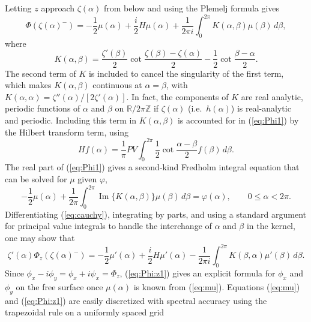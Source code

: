 \documentclass[11pt]{article}
\theoremstyle{plain}
\theoremstyle{definition}
\theoremstyle{definition}
\newcommand{\opn}{\operatorname}
\newcommand{\im}{\opn{Im}}
\newcommand{\mbb}[1]{\mathbb{#1}}
\begin{document}
%
Letting $z$ approach $\zeta(\alpha)$ from below and using the Plemelj
formula \cite{muskhelishvili:sing} gives
%
\begin{equation}
  \label{eq:Phi1}
  \Phi(\zeta(\alpha)^-) = -\frac12\mu(\alpha)+\frac i2H\mu(\alpha) + \frac1{2\pi i}\int_0^{2\pi}
  K(\alpha,\beta)\mu(\beta)\,d\beta,
\end{equation}
%
where
%
\begin{equation}
  \label{eq:K:ab}
  K(\alpha,\beta) =
  \frac{\zeta'(\beta)}2\cot\frac{\zeta(\beta)-\zeta(\alpha)}2 -
  \frac12\cot\frac{\beta-\alpha}2.
\end{equation}
%
The second term of $K$ is included to cancel the singularity of the
first term, which makes $K(\alpha,\beta)$ continuous at
$\alpha=\beta$, with $K(\alpha,\alpha) =
\zeta''(\alpha)/[2\zeta'(\alpha)]$. In fact, the components of $K$ are
real analytic, periodic functions of $\alpha$ and $\beta$ on $\mbb
R/2\pi\mbb Z$ if $\zeta(\alpha)$ (i.e.~$h(\alpha)$) is real-analytic
and periodic.  Including this term in $K(\alpha,\beta)$ is accounted
for in (\ref{eq:Phi1}) by the Hilbert transform term, using
%
\begin{equation}
  H f(\alpha)=\frac1\pi PV\!\int_0^{2\pi}\frac12\cot\frac{\alpha-\beta}2f(\beta)\,d\beta.
\end{equation}
%
The real part of (\ref{eq:Phi1}) gives a second-kind Fredholm integral equation
\cite{folland:pde} that can be solved for $\mu$ given $\varphi$,
%
\begin{equation}\label{eq:mu}
  -\frac12\mu(\alpha) + \frac1{2\pi}\int_0^{2\pi}\im\{K(\alpha,\beta)\}\mu(\beta)\,d\beta
  = \varphi(\alpha), \qquad 0\le\alpha<2\pi.
\end{equation}
%
Differentiating (\ref{eq:cauchy}), integrating by parts, and using a
standard argument for principal value integrals to handle the
interchange of $\alpha$ and $\beta$ in the kernel, one may show
\cite{wilkening-yu:shooting-2012} that
%
\begin{equation}
  \label{eq:Phi:z1}
  \zeta'(\alpha)\Phi_z(\zeta(\alpha)^-) = 
  -\frac12\mu'(\alpha)+\frac i2H\mu'(\alpha) - \frac1{2\pi i}\int_0^{2\pi}
  K(\beta,\alpha)\mu'(\beta)\,d\beta.
\end{equation}
%
Since $\phi_x-i\phi_y = \phi_x+i\psi_x = \Phi_z$, (\ref{eq:Phi:z1})
gives an explicit formula for $\phi_x$ and $\phi_y$ on the free
surface once $\mu(\alpha)$ is known from (\ref{eq:mu}). Equations
(\ref{eq:mu}) and (\ref{eq:Phi:z1}) are easily discretized with
spectral accuracy using the trapezoidal rule on a uniformly spaced grid
\end{document}
